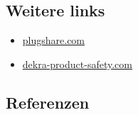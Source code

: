 \documentclass[
]{book}
\providecommand{\tightlist}{%
  \setlength{\itemsep}{0pt}\setlength{\parskip}{0pt}}
\begin{document}
\hypertarget{weitere-links-6}{%
\subsection*{Weitere links}\label{weitere-links-6}}

\begin{itemize}
\tightlist
\item
  \href{https://www.plugshare.com/en}{plugshare.com}
\item
  \href{https://www.dekra-product-safety.com/en/ev-charging-station-technology}{dekra-product-safety.com}
\end{itemize}

\hypertarget{referenzen-8}{%
\subsection*{Referenzen}\label{referenzen-8}}
\end{document}
